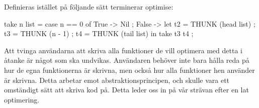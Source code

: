 \documentclass[../Optimise]{subfiles}
\begin{document}
Definieras  istället på följande sätt terminerar optimise:

\begin{codeEx}
take n list = case n == 0 of
    { True -> Nil
    ; False -> let 
        { t2 = THUNK (head list)
        ; t3 = THUNK (n - 1)
        ; t4 = THUNK (tail list)
        } in  take t3 t4
    };
\end{codeEx}


Att tvinga användarna att skriva alla funktioner
de vill optimera med detta i åtanke är något som ska undvikas.
 Användaren behöver inte bara hålla reda på 
hur de egna funktionerna är skrivna, men också hur alla funktioner hen använder är skrivna. 
Detta arbetar emot abstraktionsprincipen, och skulle vara ett omständigt sätt
 att skriva kod på. 
Detta leder oss in på vår strävan efter en lat optimering.
\end{document}
